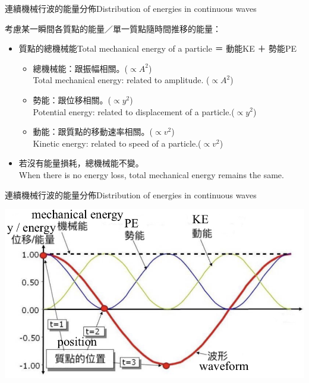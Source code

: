 \documentclass[beamer=true]{standalone}
\begin{document}

\begin{frame}{連續機械行波的能量分佈Distribution of energies in continuous waves}
    \begin{block}{考慮某一瞬間各質點的能量／單一質點隨時間推移的能量：}
        \begin{itemize}
            \item 質點的總機械能Total mechanical energy of a particle ＝ 動能KE ＋ 勢能PE
                  \begin{itemize}
                      \item 總機械能：跟振幅相關。($\propto A^2$)
                            \\ Total mechanical energy: related to amplitude. ($\propto A^2$)
                      \item 勢能：跟位移相關。($\propto y^2$)
                            \\ Potential energy: related to displacement of a particle.($\propto y^2$)
                      \item 動能：跟質點的移動速率相關。($\propto v^2$)
                            \\ Kinetic energy: related to speed of a particle.($\propto v^2$)
                  \end{itemize}
            \item 若沒有能量損耗，總機械能不變。
                  \\ When there is no energy loss, total mechanical energy remains the same.
        \end{itemize}
    \end{block}
\end{frame}


\begin{frame}{連續機械行波的能量分佈Distribution of energies in continuous waves}
    \par{\par\centering\includegraphics[width=\textwidth]{./img/ch2_cf_2024-05-22-11-31-38.png}\par}

\end{frame}
\end{document}
